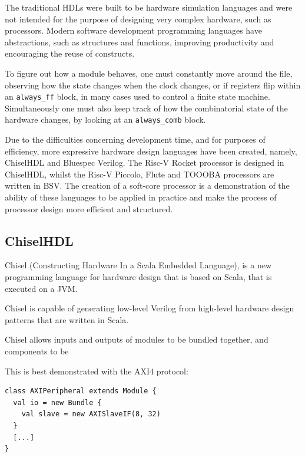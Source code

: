 \documentclass[a4paper,8pt]{report}
\begin{document}
The traditional HDLs were built to be hardware simulation languages and were not
intended for the purpose of designing very complex hardware, such as processors.
Modern software development programming languages have abstractions, such as
structures and functions, improving productivity and encouraging the reuse of
constructs.

To figure out how a module behaves, one must constantly move around the file,
observing how the state changes when the clock changes, or if registers flip
within an \texttt{always\_ff} block, in many cases used to control a finite state
machine. Simultaneously one must also keep track of how the combinatorial state
of the hardware changes, by looking at an \texttt{always\_comb} block.

Due to the difficulties concerning development time, and for purposes of
efficiency, more expressive hardware design languages have been created, namely,
ChiselHDL and Bluespec Verilog. The Risc-V Rocket processor is designed in
ChiselHDL, whilst the Risc-V Piccolo, Flute and TOOOBA processors are written in
BSV. The creation of a soft-core processor is a demonstration of the ability of
these languages to be applied in practice and make the process of processor
design more efficient and structured.


\subsection{ChiselHDL}
Chisel (Constructing Hardware In a Scala Embedded Language), is a new
programming language for hardware design that is based on Scala, that is
executed on a JVM.

Chisel is capable of generating low-level Verilog from high-level hardware
design patterns that are written in Scala.

Chisel allows inputs and outputs of modules to be bundled together, and
components to be


This is best demonstrated with the AXI4 protocol:
\tiny
\begin{verbatim}
class AXIPeripheral extends Module {
  val io = new Bundle {
    val slave = new AXISlaveIF(8, 32)
  }
  [...]
}
\end{verbatim}
\normalsize
\end{document}
